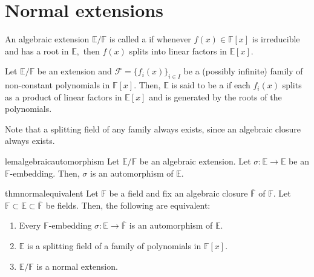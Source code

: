 \chapter{Normal extensions}

\begin{defn}%
    An algebraic extension $\mathbb{E}/\mathbb{F}$ is called a  if whenever $f(x) \in \mathbb{F}[x]$ is irreducible and has a root in $\mathbb{E},$ then $f(x)$ splits into linear factors in $\mathbb{E}[x].$ 
\end{defn}

\begin{defn}%
    Let $\mathbb{E}/\mathbb{F}$ be an extension and $\mathcal{F} = \{f_i(x)\}_{i \in I}$ be a (possibly infinite) family of non-constant polynomials in $\mathbb{F}[x].$ Then, $\mathbb{E}$ is said to be a  if each $f_i(x)$ splits as a product of linear factors in $\mathbb{E}[x]$ and is generated by the roots of the polynomials.
\end{defn}

Note that a splitting field of any family always exists, since an algebraic closure always exists.

\begin{restatable}[]{lem}{algebraicautomorphism}
\label{lem:algebraicautomorphism}
    Let $\mathbb{E}/\mathbb{F}$ be an algebraic extension. Let $\sigma : \mathbb{E} \to \mathbb{E}$ be an $\mathbb{F}$-embedding. Then, $\sigma$ is an automorphism of $\mathbb{E}.$ \hfill\hyperref[lem:algebraicautomorphism2]{\downsym}
\end{restatable}

\begin{restatable}[]{thm}{normalequivalent}
\label{thm:normalequivalent}
    Let $\mathbb{F}$ be a field and fix an algebraic closure $\overline{\mathbb{F}}$ of $\mathbb{F}.$ Let $\mathbb{F} \subset \mathbb{E} \subset \overline{\mathbb{F}}$ be fields. Then, the following are equivalent:
    \begin{enumerate}
         \item \label{item:001} Every $\mathbb{F}$-embedding $\sigma : \mathbb{E} \to \overline{\mathbb{F}}$ is an automorphism of $\mathbb{E}.$
         \item \label{item:002} $\mathbb{E}$ is a splitting field of a family of polynomials in $\mathbb{F}[x].$
         \item \label{item:003} $\mathbb{E}/\mathbb{F}$ is a normal extension. \hfill\hyperref[thm:normalequivalent2]{\downsym}
     \end{enumerate} 
\end{restatable}

